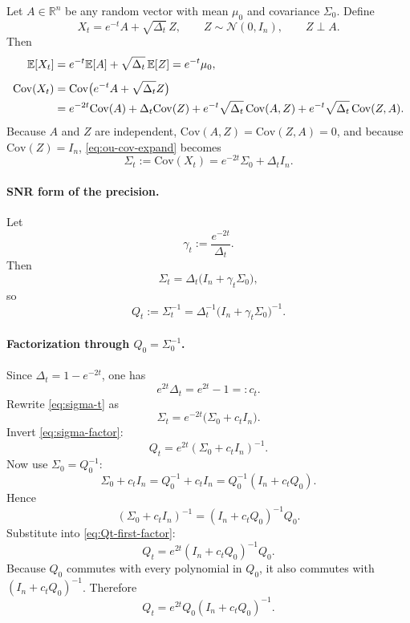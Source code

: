 \documentclass[11pt,a4paper]{article}
\newcommand{\R}{\mathbb{R}}
\newcommand{\E}{\mathbb{E}}
\newcommand{\Cov}{\mathrm{Cov}}
\newcommand{\Dt}{\Delta_t}
\begin{document}
Let $A\in\R^n$ be any random vector with mean $\mu_0$ and covariance $\Sigma_0$. Define
\begin{equation}
X_t = e^{-t} A + \sqrt{\Dt} \, Z,
\qquad
Z \sim \mathcal N(0,I_n),
\qquad Z \perp A.
\label{eq:generic-ou}
\end{equation}
Then
\begin{align}
\E[X_t]
&= e^{-t}\E[A] + \sqrt{\Dt}\,\E[Z]
= e^{-t}\mu_0,
\label{eq:ou-mean-derivation}\\[0.4em]
\Cov(X_t)
&=
\Cov\bigl(e^{-t}A + \sqrt{\Dt} Z\bigr)
\notag\\
&=
 e^{-2t}\Cov(A)
 + \Dt \Cov(Z)
 + e^{-t}\sqrt{\Dt}\,\Cov(A,Z)
 + e^{-t}\sqrt{\Dt}\,\Cov(Z,A).
\label{eq:ou-cov-expand}
\end{align}
Because $A$ and $Z$ are independent, $\Cov(A,Z)=\Cov(Z,A)=0$, and because $\Cov(Z)=I_n$, \eqref{eq:ou-cov-expand} becomes
\begin{equation}
\Sigma_t := \Cov(X_t) = e^{-2t} \Sigma_0 + \Dt I_n.
\label{eq:sigma-t}
\end{equation}

\paragraph{SNR form of the precision.}
Let
\begin{equation}
\gamma_t := \frac{e^{-2t}}{\Dt}.
\label{eq:gamma-t}
\end{equation}
Then
\[
\Sigma_t = \Dt \bigl(I_n + \gamma_t \Sigma_0\bigr),
\]
so
\begin{equation}
Q_t := \Sigma_t^{-1}
=
\Dt^{-1} \bigl(I_n + \gamma_t \Sigma_0\bigr)^{-1}.
\label{eq:Qt-snr}
\end{equation}

\paragraph{Factorization through $Q_0=\Sigma_0^{-1}$.}
Since $\Dt = 1-e^{-2t}$, one has
\begin{equation}
e^{2t}\Dt = e^{2t}-1 =: c_t.
\label{eq:ct-def}
\end{equation}
Rewrite \eqref{eq:sigma-t} as
\begin{equation}
\Sigma_t = e^{-2t}\bigl(\Sigma_0 + c_t I_n\bigr).
\label{eq:sigma-factor}
\end{equation}
Invert \eqref{eq:sigma-factor}:
\begin{equation}
Q_t = e^{2t} (\Sigma_0 + c_t I_n)^{-1}.
\label{eq:Qt-first-factor}
\end{equation}
Now use $\Sigma_0 = Q_0^{-1}$:
\[
\Sigma_0 + c_t I_n
=
Q_0^{-1} + c_t I_n
=
Q_0^{-1}(I_n + c_t Q_0).
\]
Hence
\[
(\Sigma_0 + c_t I_n)^{-1}
=
(I_n + c_t Q_0)^{-1} Q_0.
\]
Substitute into \eqref{eq:Qt-first-factor}:
\begin{equation}
Q_t = e^{2t} (I_n + c_t Q_0)^{-1} Q_0.
\label{eq:Qt-factor-right}
\end{equation}
Because $Q_0$ commutes with every polynomial in $Q_0$, it also commutes with $(I_n+c_tQ_0)^{-1}$. Therefore
\begin{equation}
Q_t = e^{2t} Q_0 (I_n + c_t Q_0)^{-1}.
\label{eq:Qt-factor-left}
\end{equation}
\end{document}
